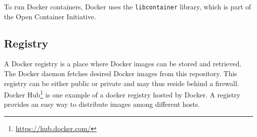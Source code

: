 To run Docker containers, Docker uses the \verb|libcontainer| library, which is part of the Open Container Initiative.

\subsection{Registry}
\label{subsec:dockerregistry}
A Docker registry is a place where Docker images can be stored and retrieved. The Docker daemon
fetches desired Docker images from this repository. This registry can be either public or private and may thus reside behind a firewall. Docker
Hub\footnote{\url{https://hub.docker.com/}} is one example of a docker registry
hosted by Docker. A registry provides an easy way to distribute images among different hosts.
